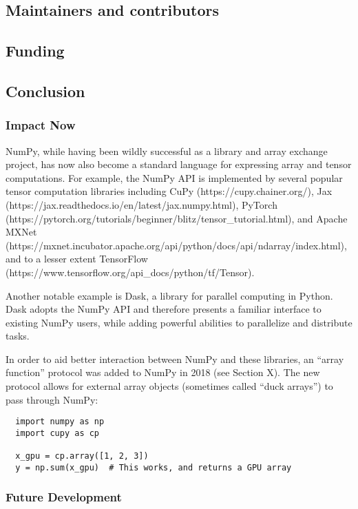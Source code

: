 \documentclass[fleqn,10pt]{wlscirep}
\begin{document}
\subsection*{Maintainers and contributors}

\subsection*{Funding}

\subsection*{Conclusion}

\subsubsection*{Impact Now}

NumPy, while having been wildly successful as a library and array
exchange project, has now also become a standard language for expressing array
and tensor computations.  For example, the NumPy API is implemented by
several popular tensor computation libraries including CuPy
(https://cupy.chainer.org/), Jax
(https://jax.readthedocs.io/en/latest/jax.numpy.html), PyTorch
(https://pytorch.org/tutorials/beginner/blitz/tensor\_tutorial.html),
and Apache MXNet
(https://mxnet.incubator.apache.org/api/python/docs/api/ndarray/index.html),
and to a lesser extent TensorFlow
(https://www.tensorflow.org/api\_docs/python/tf/Tensor).

Another notable example is Dask, a library for parallel computing in
Python.  Dask adopts the NumPy API and therefore presents a familiar
interface to existing NumPy users, while adding powerful abilities to
parallelize and distribute tasks.

In order to aid better interaction between NumPy and these libraries,
an ``array function'' protocol was added to NumPy in 2018 (see Section
X). The new protocol allows for external array objects (sometimes
called ``duck arrays'') to pass through NumPy:

\begin{lstlisting}
  import numpy as np
  import cupy as cp

  x_gpu = cp.array([1, 2, 3])
  y = np.sum(x_gpu)  # This works, and returns a GPU array
\end{lstlisting}

\subsubsection*{Future Development}
\end{document}
